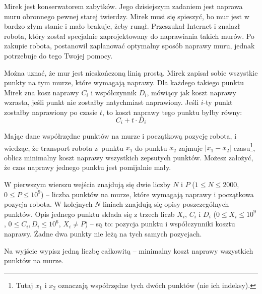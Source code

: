 

\usepackage[utf8]{inputenc}
\usepackage[T1]{fontenc}
\usepackage[polish]{babel}
\usepackage{polski}





Mirek jest konserwatorem zabytków.
Jego dzisiejszym zadaniem jest naprawa muru obronnego pewnej starej twierdzy.
Mirek musi się spieszyć, bo mur jest w bardzo złym stanie i mało brakuje, żeby runął.
Przeszukał Internet i znalazł robota, który został specjalnie zaprojektowany do naprawiania takich murów.
Po zakupie robota, postanowił zaplanować optymalny sposób naprawy muru, jednak potrzebuje do tego Twojej pomocy.

Można uznać, że mur jest nieskończoną linią prostą.
Mirek zapisał sobie wszystkie punkty na tym murze, które wymagają naprawy.
Dla każdego takiego punktu Mirek zna kosz naprawy $C_i$ i współczynnik $D_i$,
	mówiący jak koszt naprawy wzrasta, jeśli punkt nie zostałby natychmiast naprawiony.
Jeśli $i$-ty punkt zostałby naprawiony po czasie $t$, to koszt naprawy tego punktu byłby równy:
\[ C_i + t \cdot D_i \]


Mając dane współrzędne punktów na murze i początkową pozycję robota,
	i wiedząc, że transport robota z~punktu $x_1$ do punktu $x_2$ zajmuje $|x_1 - x_2|$
	czasu\footnote{Tutaj $x_1$ i $x_2$ oznaczają współrzędne tych dwóch punktów (nie ich indeksy).},
	oblicz minimalny koszt naprawy wszystkich zepsutych punktów.
Możesz założyć, że czas naprawy jednego punktu jest pomijalnie mały.


W pierwszym wierszu wejścia znajdują się dwie liczby $N$ i $P$ ($1 \le N \le 2000$, $0 \le P \le 10^9$)
	-- liczba punktów na murze, które wymagają naprawy i początkowa pozycja robota.
W kolejnych $N$ liniach znajdują się opisy poszczególnych punktów.
Opis jednego punktu składa się z trzech liczb $X_i$, $C_i$ i $D_i$
	($0 \le X_i \le 10^9$, $0 \le C_i, D_i \le 10^6$, $X_i \neq P$)
	-- są to: pozycja punktu i współczynniki kosztu naprawy.
Żadne dwa punkty nie leżą na tych samych pozycjach.


Na wyjście wypisz jedną liczbę całkowitą -- minimalny koszt naprawy wszystkich punktów na murze.

